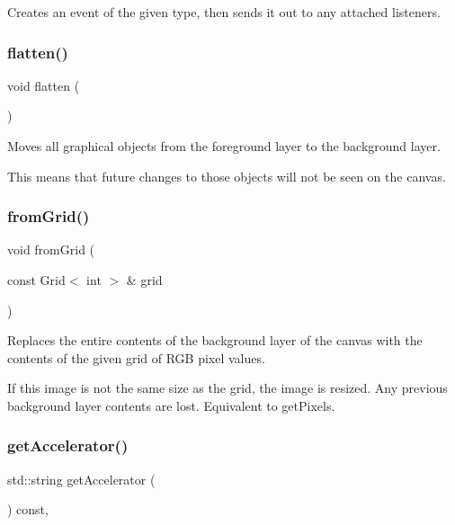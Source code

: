 Creates an event of the given type, then sends it out to any attached listeners. 

\mbox{\label{classGCanvas_a4c4590df33ce47ad8a42e06f9f44fc93}} 
\subsubsection{\texorpdfstring{flatten()}{flatten()}}
{\footnotesize\ttfamily void flatten (\begin{DoxyParamCaption}{ }\end{DoxyParamCaption})\hspace{0.3cm}{\ttfamily [virtual]}}



Moves all graphical objects from the foreground layer to the background layer. 

This means that future changes to those objects will not be seen on the canvas. \mbox{\label{classGCanvas_a46b18491b5230c765fbd9b8c7a095587}} 
\subsubsection{\texorpdfstring{from\+Grid()}{fromGrid()}}
{\footnotesize\ttfamily void from\+Grid (\begin{DoxyParamCaption}\item[{const Grid$<$ int $>$ \&}]{grid }\end{DoxyParamCaption})\hspace{0.3cm}{\ttfamily [virtual]}}



Replaces the entire contents of the background layer of the canvas with the contents of the given grid of R\+GB pixel values. 

If this image is not the same size as the grid, the image is resized. Any previous background layer contents are lost. Equivalent to get\+Pixels. \mbox{\label{classGInteractor_a69f8d23ed8f207fbecad99960776e942}} 
\subsubsection{\texorpdfstring{get\+Accelerator()}{getAccelerator()}}
{\footnotesize\ttfamily std\+::string get\+Accelerator (\begin{DoxyParamCaption}{ }\end{DoxyParamCaption}) const\hspace{0.3cm}{\ttfamily [virtual]}, {\ttfamily [inherited]}}



